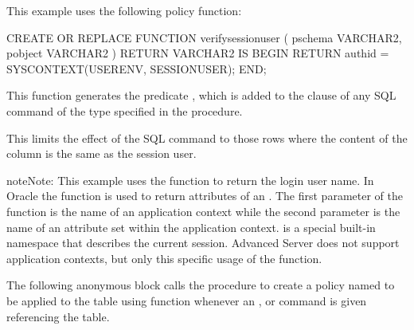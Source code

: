 \documentclass[letterpaper,10pt,english,openany,oneside]{sphinxmanual}
\begin{document}

This example uses the following policy function:

%
\begin{sphinxVerbatim}[commandchars=\\\{\}]
CREATE OR REPLACE FUNCTION verify\PYGZus{}session\PYGZus{}user (
    p\PYGZus{}schema        VARCHAR2,
    p\PYGZus{}object        VARCHAR2
)
RETURN VARCHAR2
IS
BEGIN
    RETURN \PYGZsq{}authid = SYS\PYGZus{}CONTEXT(\PYGZsq{}\PYGZsq{}USERENV\PYGZsq{}\PYGZsq{}, \PYGZsq{}\PYGZsq{}SESSION\PYGZus{}USER\PYGZsq{}\PYGZsq{})\PYGZsq{};
END;
\end{sphinxVerbatim}

This function generates the predicate , which is added to the  clause of any SQL command
of the type specified in the  procedure.

This limits the effect of the SQL command to those rows where the
content of the  column is the same as the session user.

\begin{sphinxadmonition}{note}{Note:}
This example uses the  function to return the login user name. In Oracle the  function is used to return attributes of an . The first parameter of the  function is the name of an application context while the second parameter is the name of an attribute set within the application context.  is a special built-in namespace that describes the current session. Advanced Server does not support application contexts, but only this specific usage of the  function.
\end{sphinxadmonition}

The following anonymous block calls the  procedure to create
a policy named  to be applied to the  table using
function  whenever an , or 
command is given referencing the  table.
\end{document}
